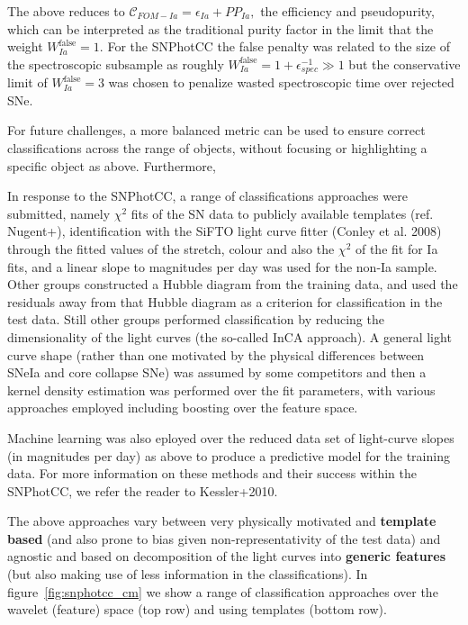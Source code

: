 The above reduces to $\mathcal{C}_{FOM-Ia}  = \epsilon_{Ia} + PP_{Ia},$ the efficiency and pseudopurity, which can be interpreted as the traditional purity factor in the limit that the weight $W_{Ia}^\mathrm{false} = 1$.
For the SNPhotCC the false penalty was related to the size of the spectroscopic subsample as roughly $W_{Ia}^\mathrm{false} = 1 + \epsilon_{spec}^{-1} \gg 1$ but the conservative limit of $W_{Ia}^\mathrm{false} = 3$ was chosen to penalize wasted spectroscopic time over rejected SNe.

For future challenges, a more balanced metric can be used to ensure correct classifications across the range of objects, without focusing or highlighting a specific object as above.
Furthermore,

In response to the SNPhotCC, a range of classifications approaches were submitted, namely $\chi^{2}$ fits of the SN data to publicly available templates (ref. Nugent+), identification with the SiFTO light curve fitter (Conley et al. 2008) through the fitted values of the stretch, colour and also the $\chi^{2}$ of the fit for Ia fits, and a linear slope to magnitudes per day was used for the non-Ia sample.
Other groups constructed a Hubble diagram from the training data, and used the residuals away from that Hubble diagram as a criterion for classification in the test data.
Still other groups performed classification by reducing the dimensionality of the light curves (the so-called InCA approach).
A general light curve shape (rather than one motivated by the physical differences between SNeIa and core collapse SNe) was assumed by some competitors and then a kernel density estimation was performed over the fit parameters, with various approaches employed including boosting over the feature space.

Machine learning was also eployed over the reduced data set of light-curve slopes (in magnitudes per day) as above to produce a predictive model for the training data.
For more information on these methods and their success within the SNPhotCC, we refer the reader to Kessler+2010.

The above approaches vary between very physically motivated and \textbf{template based} (and also prone to bias given non-representativity of the test data) and agnostic and based on decomposition of the light curves into \textbf{generic features} (but also making use of less information in the classifications).
In figure~\ref{fig:snphotcc_cm} we show a range of classification approaches over the wavelet (feature) space (top row) and using templates (bottom row).


